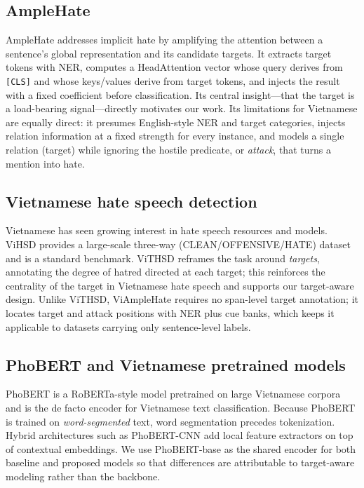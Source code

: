 \documentclass[11pt]{article}
\begin{document}
\subsection{AmpleHate}
AmpleHate \citep{amplehate} addresses implicit hate by amplifying the attention between a sentence's global representation and its candidate targets. It extracts target tokens with NER, computes a HeadAttention vector whose query derives from \texttt{[CLS]} and whose keys/values derive from target tokens, and injects the result with a fixed coefficient before classification. Its central insight---that the target is a load-bearing signal---directly motivates our work. Its limitations for Vietnamese are equally direct: it presumes English-style NER and target categories, injects relation information at a fixed strength for every instance, and models a single relation (target) while ignoring the hostile predicate, or \emph{attack}, that turns a mention into hate.

\subsection{Vietnamese hate speech detection}
Vietnamese has seen growing interest in hate speech resources and models. ViHSD \citep{vihsd} provides a large-scale three-way (CLEAN/OFFENSIVE/HATE) dataset and is a standard benchmark. ViTHSD \citep{vithsd} reframes the task around \emph{targets}, annotating the degree of hatred directed at each target; this reinforces the centrality of the target in Vietnamese hate speech and supports our target-aware design. Unlike ViTHSD, ViAmpleHate requires no span-level target annotation; it locates target and attack positions with NER plus cue banks, which keeps it applicable to datasets carrying only sentence-level labels.

\subsection{PhoBERT and Vietnamese pretrained models}
PhoBERT \citep{phobert} is a RoBERTa-style model pretrained on large Vietnamese corpora and is the de facto encoder for Vietnamese text classification. Because PhoBERT is trained on \emph{word-segmented} text, word segmentation precedes tokenization. Hybrid architectures such as PhoBERT-CNN add local feature extractors on top of contextual embeddings. We use PhoBERT-base as the shared encoder for both baseline and proposed models so that differences are attributable to target-aware modeling rather than the backbone.
\end{document}
